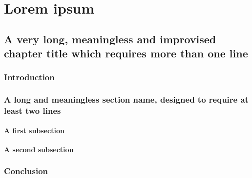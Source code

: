 \part{Lorem ipsum}

\chapter{A very long, meaningless and improvised chapter title which requires more than one line}

\section{Introduction}

\lipsum[1-2]


\section{A long and meaningless section name, designed to require at least two lines}

\lipsum[3-4]


\subsection{A first subsection}

\lipsum[5-6]


\subsection{A second subsection}

\lipsum[7-8]


\section{Conclusion}

\lipsum[9-10]
